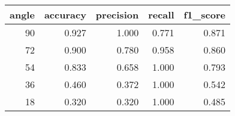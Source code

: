 \begin{tabular}{rrrrr}
\toprule
angle & accuracy & precision & recall & f1_score \\
\midrule
90 & 0.927 & 1.000 & 0.771 & 0.871 \\
72 & 0.900 & 0.780 & 0.958 & 0.860 \\
54 & 0.833 & 0.658 & 1.000 & 0.793 \\
36 & 0.460 & 0.372 & 1.000 & 0.542 \\
18 & 0.320 & 0.320 & 1.000 & 0.485 \\
\bottomrule
\end{tabular}

